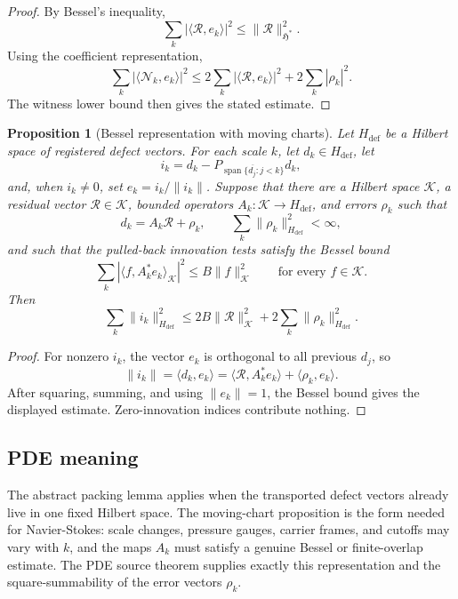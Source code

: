 \documentclass[11pt]{article}
\newtheorem{proposition}[theorem]{Proposition}
\begin{document}
\begin{proof}
By Bessel's inequality,
\[
\sum_k|\langle\mathcal R,e_k\rangle|^2
\le
\|\mathcal R\|_{\mathfrak H^*}^2.
\]
Using the coefficient representation,
\[
\sum_k|\langle\mathcal N_k,e_k\rangle|^2
\le
2\sum_k|\langle\mathcal R,e_k\rangle|^2
+2\sum_k|\rho_k|^2.
\]
The witness lower bound then gives the stated estimate.
\end{proof}

\begin{proposition}[Bessel representation with moving charts]
Let \(H_{\mathrm{def}}\) be a Hilbert space of registered defect vectors.  For
each scale \(k\), let \(d_k\in H_{\mathrm{def}}\), let
\[
i_k=d_k-P_{\overline{\operatorname{span}\{d_j:j<k\}}}d_k,
\]
and, when \(i_k\ne0\), set \(e_k=i_k/\|i_k\|\).  Suppose that there are a Hilbert
space \(\mathcal K\), a residual vector \(\mathcal R\in\mathcal K\), bounded
operators \(A_k:\mathcal K\to H_{\mathrm{def}}\), and errors \(\rho_k\) such that
\[
d_k=A_k\mathcal R+\rho_k,
\qquad
\sum_k\|\rho_k\|_{H_{\mathrm{def}}}^2<\infty,
\]
and such that the pulled-back innovation tests satisfy the Bessel bound
\[
\sum_k|\langle f,A_k^*e_k\rangle_{\mathcal K}|^2
\le
B\|f\|_{\mathcal K}^2
\qquad
\text{for every } f\in\mathcal K .
\]
Then
\[
\sum_k\|i_k\|_{H_{\mathrm{def}}}^2
\le
2B\|\mathcal R\|_{\mathcal K}^2
+2\sum_k\|\rho_k\|_{H_{\mathrm{def}}}^2 .
\]
\end{proposition}

\begin{proof}
For nonzero \(i_k\), the vector \(e_k\) is orthogonal to all previous \(d_j\), so
\[
\|i_k\|
=
\langle d_k,e_k\rangle
=
\langle\mathcal R,A_k^*e_k\rangle+\langle\rho_k,e_k\rangle .
\]
After squaring, summing, and using \(\|e_k\|=1\), the Bessel bound gives the
displayed estimate.  Zero-innovation indices contribute nothing.
\end{proof}

\subsection{PDE meaning}

The abstract packing lemma applies when the transported defect vectors already
live in one fixed Hilbert space.  The moving-chart proposition is the form needed
for Navier-Stokes: scale changes, pressure gauges, carrier frames, and cutoffs
may vary with \(k\), and the maps \(A_k\) must satisfy a genuine Bessel or
finite-overlap estimate.  The PDE source theorem supplies exactly this
representation and the square-summability of the error vectors \(\rho_k\).
\end{document}
